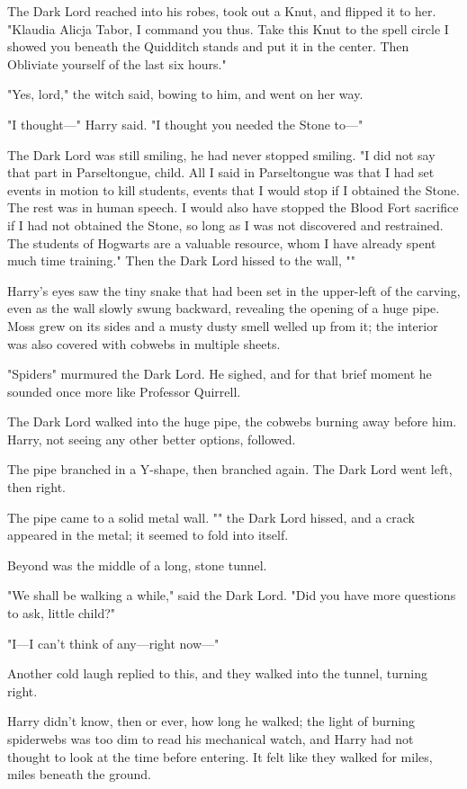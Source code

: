 The Dark Lord reached into his robes, took out a Knut, and flipped it to her.
"Klaudia Alicja Tabor, I command you thus. Take this Knut to the spell circle I
showed you beneath the Quidditch stands and put it in the center. Then
Obliviate yourself of the last six hours."

"Yes, lord," the witch said, bowing to him, and went on her way.

"I thought---" Harry said. "I thought you needed the Stone to---"

The Dark Lord was still smiling, he had never stopped smiling. "I did not say
that part in Parseltongue, child. All I said in Parseltongue was that I had set
events in motion to kill students, events that I would stop if I obtained the
Stone. The rest was in human speech. I would also have stopped the Blood Fort
sacrifice if I had not obtained the Stone, so long as I was not discovered and
restrained. The students of Hogwarts are a valuable resource, whom I have
already spent much time training." Then the Dark Lord hissed to the wall,
""

Harry's eyes saw the tiny snake that had been set in the upper-left of the
carving, even as the wall slowly swung backward, revealing the opening of a
huge pipe. Moss grew on its sides and a musty dusty smell welled up from it;
the interior was also covered with cobwebs in multiple sheets.

"Spiders{\el}" murmured the Dark Lord. He sighed, and for that brief moment
he sounded once more like Professor Quirrell.

The Dark Lord walked into the huge pipe, the cobwebs burning away before him.
Harry, not seeing any other better options, followed.

The pipe branched in a Y-shape, then branched again. The Dark Lord went left,
then right.

The pipe came to a solid metal wall. "" the Dark Lord hissed, and a
crack appeared in the metal; it seemed to fold into itself.

Beyond was the middle of a long, stone tunnel.

"We shall be walking a while," said the Dark Lord. "Did you have more questions
to ask, little child?"

"I---I can't think of any---right now---"

Another cold laugh replied to this, and they walked into the tunnel, turning
right.

Harry didn't know, then or ever, how long he walked; the light of burning
spiderwebs was too dim to read his mechanical watch, and Harry had not thought
to look at the time before entering. It felt like they walked for miles, miles
beneath the ground.

